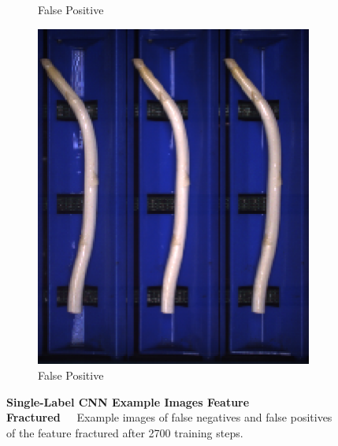 \begin{figure}[h]
\begin{subfigure}{0.3\textwidth}
		\vspace{-5pt}
		\caption{False Positive}
	\end{subfigure}
	\begin{subfigure}{0.3\textwidth}
		\includegraphics[width=0.9\linewidth]{Figures/appendix/fractured_falsepositive_03.png}
		\vspace{-5pt}
		\caption{False Positive}
	\end{subfigure}
	\vspace{-5pt}
	\caption[Single-Label CNN Example Images Feature Fractured]{\textbf{Single-Label CNN Example Images Feature Fractured}~~~Example images of false negatives and false positives of the feature fractured after 2700 training steps.}
	\vspace{-20pt}
    \label{fig:ExampleImagesFractured}
\end{figure}


